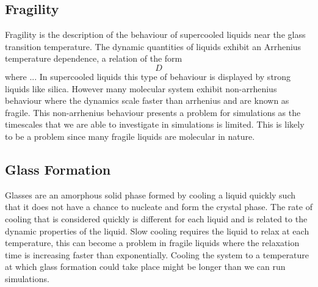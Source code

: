 \subsection{Fragility}

Fragility is the description of the behaviour of supercooled liquids near the glass transition temperature. The dynamic quantities of liquids exhibit an Arrhenius temperature dependence, a relation of the form
\begin{equation}
    D
\end{equation}
where ... In supercooled liquids this type of behaviour is displayed by strong liquids like silica. However many molecular system exhibit non-arrhenius behaviour where the dynamics scale faster than arrhenius and are known as fragile. This non-arrhenius behaviour presents a problem for simulations as the timescales that we are able to investigate in simulations is limited. This is likely to be a problem since many fragile liquids are molecular in nature.


\subsection{Glass Formation}

Glasses are an amorphous solid phase formed by cooling a liquid quickly such that it does not have a chance to nucleate and form the crystal phase. The rate of cooling that is considered quickly is different for each liquid and is related to the dynamic properties of the liquid. Slow cooling requires the liquid to relax at each temperature, this can become a problem in fragile liquids where the relaxation time is increasing faster than exponentially. Cooling the system to a temperature at which glass formation could take place might be longer than we can run simulations.
